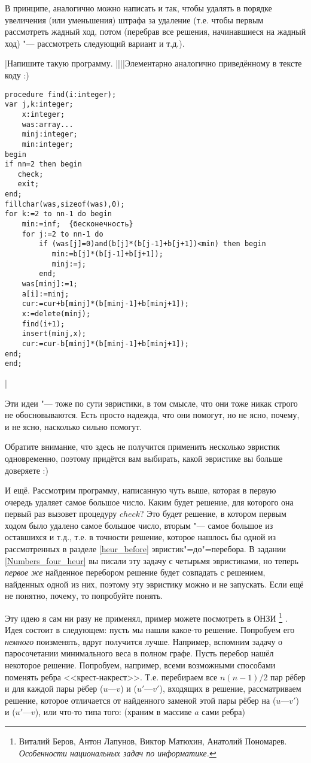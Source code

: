 В принципе, аналогично можно написать и так, чтобы удалять в порядке увеличения (или уменьшения) штрафа за удаление
(т.е. чтобы первым рассмотреть жадный ход, потом (перебрав все решения, начинавшиеся на жадный 
ход) "--- рассмотреть следующий вариант и т.д.).

\task|Напишите такую программу.
||||Элементарно аналогично приведённому в тексте коду :)
\begin{codesample}\begin{verbatim}
procedure find(i:integer);
var j,k:integer;
    x:integer;
    was:array...
    minj:integer;
    min:integer;
begin
if nn=2 then begin
   check;
   exit;
end;
fillchar(was,sizeof(was),0);
for k:=2 to nn-1 do begin
    min:=inf;  {бесконечность}
    for j:=2 to nn-1 do 
        if (was[j]=0)and(b[j]*(b[j-1]+b[j+1])<min) then begin
           min:=b[j]*(b[j-1]+b[j+1]);
           minj:=j;
        end;
    was[minj]:=1;
    a[i]:=minj;
    cur:=cur+b[minj]*(b[minj-1]+b[minj+1]);
    x:=delete(minj);
    find(i+1);
    insert(minj,x);
    cur:=cur-b[minj]*(b[minj-1]+b[minj+1]);
end;
end;
\end{verbatim}
\end{codesample}
|

Эти идеи "--- тоже по сути эвристики, в том смысле, что они тоже никак строго не 
обосновываются. Есть просто надежда, что они помогут, но не ясно, почему, и не ясно, насколько сильно помогут.

Обратите внимание, что здесь не получится применить несколько эвристик одновременно, поэтому придётся вам выбирать, какой эвристике вы больше доверяете :)

И ещё. Рассмотрим программу, написанную чуть выше, которая в первую очередь удаляет самое большое число. Каким будет решение, для которого она первый раз вызовет процедуру $check$? Это будет решение, в котором первым ходом было удалено самое большое число, вторым "--- самое большое из оставшихся и т.д., т.е. в точности решение, которое нашлось бы одной из рассмотренных в разделе \ref{heur_before} эвристик"=до"=перебора. В задании \ref{Numbers_four_heur} вы писали эту задачу с четырьмя эвристиками, но теперь \textit{первое же} найденное перебором решение будет совпадать с решением, найденных одной из них, поэтому эту эвристику можно и не запускать. Если ещё не понятно, почему, то попробуйте понять.

Эту идею я сам ни разу не применял, пример можете посмотреть в ОНЗИ%
\footnote{Виталий Беров, Антон Лапунов,
Виктор Матюхин, Анатолий Пономарев. \textit{Особенности
национальных задач
по информатике.}}%
.
 Идея состоит в следующем: 
пусть мы нашли какое-то решение. Попробуем его \textit{немного} поизменять, вдруг получится лучше. 
Например, вспомним задачу о паросочетании минимального веса в полном графе. Пусть перебор 
нашёл некоторое решение. Попробуем, например, всеми возможными способами поменять ребра 
<<крест-накрест>>. Т.е. перебираем все $n(n-1)/2$ пар рёбер и для каждой пары рёбер ($u$---$v$) и ($u'$---$v'$), входящих в решение, рассматриваем 
решение, которое отличается от найденного заменой этой пары рёбер на ($u$---$v'$) и ($u'$---$v$), или что-то типа того:
(храним в массиве $a$ сами ребра)

